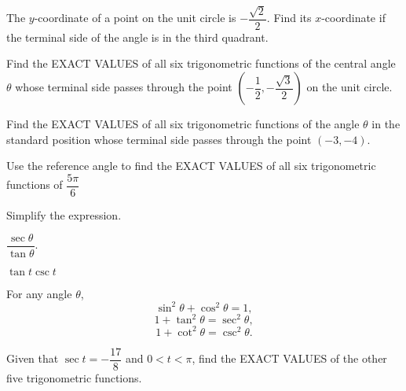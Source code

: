 
\newpage

\begin{example}
  The $y$-coordinate of a point on the unit circle is $-\dfrac{\sqrt{2}}{2}$. Find its $x$-coordinate if the terminal side of the angle is in the third quadrant.
\end{example}

\begin{example}
  Find the EXACT VALUES of all six trigonometric functions of the central angle $\theta$ whose terminal side passes through the point $(-\dfrac12, -\dfrac{\sqrt{3}}{2})$ on the unit circle.
\end{example}

\begin{example}
  Find the EXACT VALUES of all six trigonometric functions of the angle $\theta$ in the standard position whose terminal side passes through the point $(-3, -4)$.
\end{example}

\newpage

\begin{example}
  Use the reference angle to find the EXACT VALUES of all six trigonometric functions of $\dfrac{5\pi}{6}$
\end{example}


\begin{example}
  Simplify the expression.\\
  \begin{enumerate*}
    \item $\dfrac{\sec\theta}{\tan\theta}$.
    \item $\tan t\csc t$\hfill\null
  \end{enumerate*}
\end{example}


\begin{theorem}
  For any angle $\theta$,
  \[\sin^2\theta+\cos^2\theta=1,\]  
  \[1+\tan^2\theta=\sec^2\theta,\]  
  \[1+\cot^2\theta=\csc^2\theta.\]  
\end{theorem}

\begin{example}
  Given that $\sec t=-\dfrac{17}{8}$ and $0<t<\pi$, find the EXACT VALUES of the other five trigonometric functions.
\end{example}


